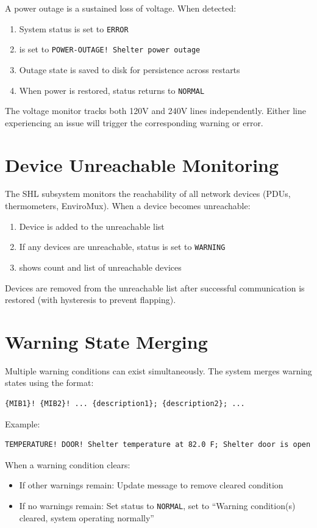 A power outage is a sustained loss of voltage. When detected:
\begin{enumerate}
    \item System status is set to \texttt{ERROR}
    \item {} is set to \texttt{POWER-OUTAGE! Shelter power outage}
    \item Outage state is saved to disk for persistence across restarts
    \item When power is restored, status returns to \texttt{NORMAL}
\end{enumerate}

\begin{noteBox}
The voltage monitor tracks both 120V and 240V lines independently. Either line experiencing an issue will trigger the corresponding warning or error.
\end{noteBox}

\section{Device Unreachable Monitoring}

The SHL subsystem monitors the reachability of all network devices (PDUs, thermometers, EnviroMux). When a device becomes unreachable:

\begin{enumerate}
    \item Device is added to the unreachable list
    \item If any devices are unreachable, status is set to \texttt{WARNING}
    \item {} shows count and list of unreachable devices
\end{enumerate}

Devices are removed from the unreachable list after successful communication is restored (with hysteresis to prevent flapping).

\section{Warning State Merging}

Multiple warning conditions can exist simultaneously. The system merges warning states using the format:

\begin{verbatim}
{MIB1}! {MIB2}! ... {description1}; {description2}; ...
\end{verbatim}

Example:
\begin{verbatim}
TEMPERATURE! DOOR! Shelter temperature at 82.0 F; Shelter door is open
\end{verbatim}

When a warning condition clears:
\begin{itemize}
    \item If other warnings remain: Update message to remove cleared condition
    \item If no warnings remain: Set status to \texttt{NORMAL}, set  to ``Warning condition(s) cleared, system operating normally''
\end{itemize}
